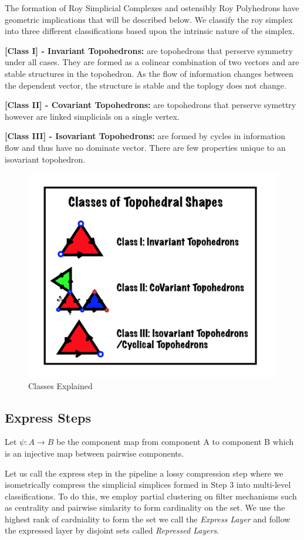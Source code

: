 The formation of Roy Simplicial Complexes and ostensibly Roy Polyhedrons have geometric implications that will be described below. We classify the roy simplex into three different classifications based upon the intrinsic nature of the simplex.

\textbf{[Class I] - Invariant Topohedrons:} are topohedrons that perserve symmetry under all cases. They are formed as a colinear combination of two vectors and are stable structures in the topohedron. As the flow of information changes between the dependent vector, the structure is stable and the toplogy does not change.   

\textbf{[Class II] - Covariant Topohedrons:} are topohedrons that perserve symettry however are linked simplicials on a single vertex. 

\textbf{[Class III] - Isovariant Topohedrons:} are formed by cycles in information flow and thus have no dominate vector. There are few properties unique to an isovariant topohedron. 


\begin{figure}[H]
  \includegraphics[width=\linewidth]{images/classes}
  \caption{Classes Explained} %
  \label{classes} 
\end{figure}

\subsection{Express Steps}
\begin{definition}
  Let $\psi: A \rightarrow B$ be the component map from component A to component B which is an injective map between pairwise components. 
\end{definition}
Let us call the express step in the pipeline a lossy compression step where we isometrically compress the simplicial simplices formed in Step 3 into multi-level classifications. To do this, we employ partial clustering on filter mechanisms such as centrality and pairwise simlarity to form cardinality on the set. We use the highest rank of cardniality to form the set we call the \textit{Express Layer} and follow the expressed layer by disjoint sets called \textit{Repressed Layers}.

